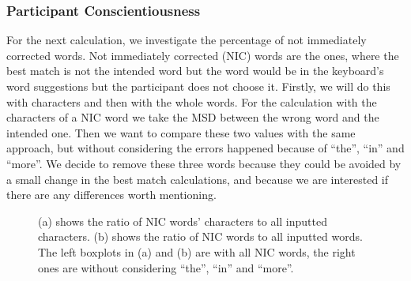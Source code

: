 \subsubsection{Participant Conscientiousness}
For the next calculation, we investigate the percentage of not immediately corrected words. Not immediately corrected (NIC) words are the ones, where the best match is not the intended word but the word would be in the keyboard's word suggestions but the participant does not choose it. Firstly, we will do this with characters and then with the whole words. For the calculation with the characters of a NIC word we take the MSD between the wrong word and the intended one. Then we want to compare these two values with the same approach, but without considering the errors happened because of ``the'', ``in'' and ``more''. We decide to remove these three words because they could be avoided by a small change in the best match calculations, and because we are interested if there are any differences worth mentioning.
\iffalse
\begin{figure}[H]
    \makebox[\textwidth][c]{
        \centering
        \subbottom[Not corrected characters with WPM\label{fig:error_user:error_user1}]{\texttt{[image: user\_error3\_1.pdf]}}\hspace{-3.0em}
        \subbottom[As (a), but without ``the'', ``in'' and ``more''\label{fig:error_user:error_user2}]{\texttt{[image: user\_error3\_2.pdf]}}
    }
    \makebox[\textwidth][c]{
        \centering
        \subbottom[Not corrected words with WPM\label{fig:error_user:error_user3}]{\texttt{[image: user\_error3\_3.pdf]}}\hspace{-3.0em}
        \subbottom[As (c), but without ``the'', ``in'' and ``more''\label{fig:error_user:error_user4}]{\texttt{[image: user\_error3\_4.pdf]}}
    }
    \caption{(a) shows the percentage of characters calculated with the MSD from wrong words that were not immediately corrected with the word suggestions. (b) is the same as (a) but errors from ``the'', ``in'' and ``more'' are ignored. (c) is the same as (a) but not with characters, but with the words as whole. (d) is the same as (b) but not with characters, but with the words as a whole}
    \label{fig:error_user}
\end{figure}
\fi
\begin{figure}[H]
    \centering
    \caption{(a) shows the ratio of NIC words' characters to all inputted characters. (b) shows the ratio of NIC words to all inputted words. The left boxplots in (a) and (b) are with all NIC words, the right ones are without considering ``the'', ``in'' and ``more''.}
    \label{fig:error_user}
\end{figure}

